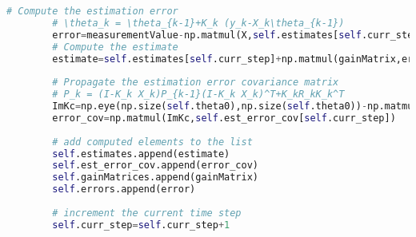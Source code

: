 \begin{lstlisting}[language=Python]
        # Compute the estimation error                    
        # \theta_k = \theta_{k-1}+K_k (y_k-X_k\theta_{k-1})
        error=measurementValue-np.matmul(X,self.estimates[self.curr_step])
        # Compute the estimate
        estimate=self.estimates[self.curr_step]+np.matmul(gainMatrix,error)
        
        # Propagate the estimation error covariance matrix
        # P_k = (I-K_k X_k)P_{k-1}(I-K_k X_k)^T+K_kR_kK_k^T
        ImKc=np.eye(np.size(self.theta0),np.size(self.theta0))-np.matmul(gainMatrix,X)
        error_cov=np.matmul(ImKc,self.est_error_cov[self.curr_step])
        
        # add computed elements to the list
        self.estimates.append(estimate)
        self.est_error_cov.append(error_cov)
        self.gainMatrices.append(gainMatrix)
        self.errors.append(error)
        
        # increment the current time step
        self.curr_step=self.curr_step+1
\end{lstlisting}


